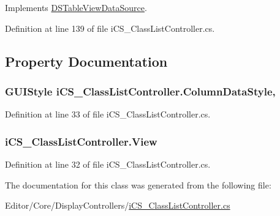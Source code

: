 Implements \hyperlink{interface_d_s_table_view_data_source_a7d1aee71e3dd3201fcb66a94b6a1511e}{D\+S\+Table\+View\+Data\+Source}.



Definition at line 139 of file i\+C\+S\+\_\+\+Class\+List\+Controller.\+cs.



\subsection{Property Documentation}
\hypertarget{classi_c_s___class_list_controller_a516bd848e02a2ccb537181f839f72337}{
\subsubsection[{Column\+Data\+Style}]{\setlength{\rightskip}{0pt plus 5cm}G\+U\+I\+Style i\+C\+S\+\_\+\+Class\+List\+Controller.\+Column\+Data\+Style\hspace{0.3cm}{\ttfamily [get]}, {\ttfamily [set]}}}\label{classi_c_s___class_list_controller_a516bd848e02a2ccb537181f839f72337}


Definition at line 33 of file i\+C\+S\+\_\+\+Class\+List\+Controller.\+cs.

\hypertarget{classi_c_s___class_list_controller_a5d3111f848a0c31db2bec0642a7d4740}{
\subsubsection[{View}]{ i\+C\+S\+\_\+\+Class\+List\+Controller.\+View\hspace{0.3cm}{\ttfamily [get]}}}\label{classi_c_s___class_list_controller_a5d3111f848a0c31db2bec0642a7d4740}


Definition at line 32 of file i\+C\+S\+\_\+\+Class\+List\+Controller.\+cs.



The documentation for this class was generated from the following file\+:\begin{DoxyCompactItemize}
\item 
Editor/\+Core/\+Display\+Controllers/\hyperlink{i_c_s___class_list_controller_8cs}{i\+C\+S\+\_\+\+Class\+List\+Controller.\+cs}\end{DoxyCompactItemize}
